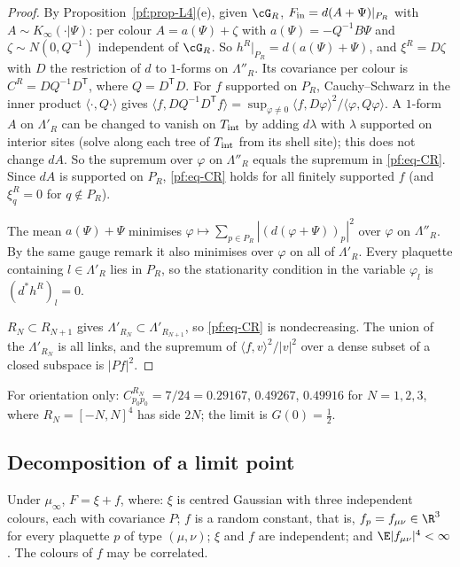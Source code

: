 \begin{proof}
By Proposition~\ref{pf:prop-L4}(e), given $\cG_R$, $F_{\rm in}=d(A+\Psi)|_{P_R}$ with $A\sim K_\infty(\cdot|\Psi)$: per colour $A=a(\Psi)+\zeta$ with $a(\Psi)=-Q^{-1}B\Psi$ and $\zeta\sim N(0,Q^{-1})$ independent of $\cG_R$. So $h^R|_{P_R}=d(a(\Psi)+\Psi)$, and $\xi^R=D\zeta$ with $D$ the restriction of $d$ to $1$-forms on $\Lambda''_R$. Its covariance per colour is $C^R=DQ^{-1}D^{\mathsf T}$, where $Q=D^{\mathsf T}D$. For $f$ supported on $P_R$, Cauchy--Schwarz in the inner product $\langle\cdot,Q\cdot\rangle$ gives
$\langle f,DQ^{-1}D^{\mathsf T}f\rangle=\sup_{\varphi\ne0}\langle f,D\varphi\rangle^2/\langle\varphi,Q\varphi\rangle$. A $1$-form $A$ on $\Lambda'_R$ can be changed to vanish on $T_{\rm int}$ by adding $d\lambda$ with $\lambda$ supported on interior sites (solve along each tree of $T_{\rm int}$ from its shell site); this does not change $dA$. So the supremum over $\varphi$ on $\Lambda''_R$ equals the supremum in \eqref{pf:eq-CR}. Since $dA$ is supported on $P_R$, \eqref{pf:eq-CR} holds for all finitely supported $f$ (and $\xi^R_q=0$ for $q\notin P_R$).

The mean $a(\Psi)+\Psi$ minimises $\varphi\mapsto\sum_{p\in P_R}|(d(\varphi+\Psi))_p|^2$ over $\varphi$ on $\Lambda''_R$. By the same gauge remark it also minimises over $\varphi$ on all of $\Lambda'_R$. Every plaquette containing $l\in\Lambda'_R$ lies in $P_R$, so the stationarity condition in the variable $\varphi_l$ is $(d^*h^R)_l=0$.

$R_N\subset R_{N+1}$ gives $\Lambda'_{R_N}\subset\Lambda'_{R_{N+1}}$, so \eqref{pf:eq-CR} is nondecreasing. The union of the $\Lambda'_{R_N}$ is all links, and the supremum of $\langle f,v\rangle^2/|v|^2$ over a dense subset of a closed subspace is $|Pf|^2$.
\end{proof}

For orientation only: $C^{R_N}_{p_0p_0}=7/24=0.29167$, $0.49267$, $0.49916$ for $N=1,2,3$, where $R_N=[-N,N]^4$ has side $2N$; the limit is $G(0)=\tfrac12$.

\subsection{Decomposition of a limit point}\label{pf:sec-R}

\begin{lemma}\label{pf:lem-R}
Under $\mu_\infty$, $F=\xi+f$, where:
$\xi$ is centred Gaussian with three independent colours, each with covariance $P$;
$f$ is a random constant, that is, $f_p=f_{\mu\nu}\in\R^3$ for every plaquette $p$ of type $(\mu,\nu)$;
$\xi$ and $f$ are independent; and $\E|f_{\mu\nu}|^4<\infty$.
The colours of $f$ may be correlated.
\end{lemma}

